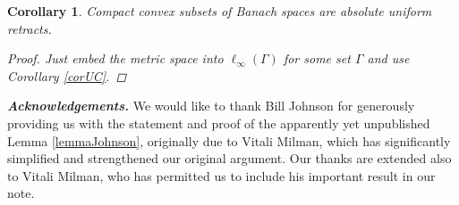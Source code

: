 \documentclass[11pt]{amsart}
\newcommand{\<}{\langle}
\renewcommand{\>}{\rangle}
\newtheorem{corollary}[theorem]{Corollary}
\theoremstyle{definition}
\theoremstyle{remark}
\numberwithin{equation}{section}
\begin{document}
\begin{corollary}
Compact convex subsets of Banach spaces are absolute uniform retracts.
\begin{proof}
Just embed the metric space into $\ell_\infty(\Gamma)$ for some set $\Gamma$ and use Corollary \ref{corUC}. 
\end{proof}
\end{corollary}

{\it \bf Acknowledgements.} We would like to thank Bill Johnson for generously providing us with the statement and proof of the apparently yet unpublished Lemma \ref{lemmaJohnson}, originally due to Vitali Milman, which  has significantly simplified and strengthened our original argument.
Our thanks are extended also to Vitali Milman, who has permitted us to include his important result in our note.


\bigskip



\printbibliography
\end{document}
